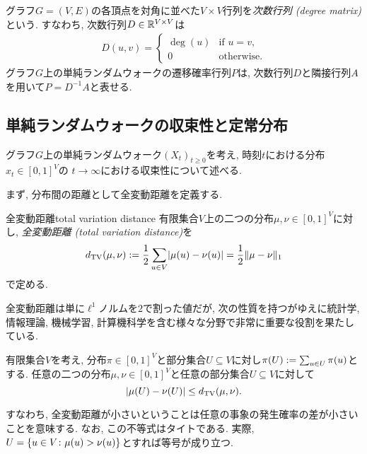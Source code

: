   グラフ$G=(V,E)$の各頂点を対角に並べた$V\times V$行列を\emph{次数行列 (degree matrix)}という.
  すなわち, 次数行列$D\in \Real^{V\times V}$は
  \begin{align*}
    D(u,v) = \begin{cases}
      \deg(u)	& \text{if }u=v,\\
      0 & \text{otherwise}.
    \end{cases}
  \end{align*}
  グラフ$G$上の単純ランダムウォークの遷移確率行列$P$は, 次数行列$D$と隣接行列$A$を用いて$P=D^{-1}A$と表せる.

\subsection{単純ランダムウォークの収束性と定常分布}
グラフ$G$上の単純ランダムウォーク$(X_t)_{t\ge 0}$を考え, 時刻$t$における分布$x_t \in [0,1]^V$の
$t\to \infty$における収束性について述べる.

まず, 分布間の距離として全変動距離を定義する.
\begin{definition}{全変動距離}{total variation distance}
  有限集合$V$上の二つの分布$\mu,\nu \in[0,1]^V$に対し, \emph{全変動距離 (total variation distance)}を
  \[
    \dtv (\mu ,\nu ) \defeq \frac{1}{2} \sum_{u\in V}\abs{\mu(u) - \nu(u)} = \frac{1}{2} \norm{\mu - \nu}_1
  \]
  で定める.
\end{definition}
全変動距離は単に$\ell^1$ノルムを$2$で割った値だが, 次の性質を持つがゆえに統計学, 情報理論, 機械学習, 計算機科学を含む様々な分野で非常に重要な役割を果たしている.
\begin{proposition}{}{}
  有限集合$V$を考え, 分布$\pi\in[0,1]^V$と部分集合$U\subseteq V$に対し$\pi(U)\defeq\sum_{u\in U}\pi(u)$とする.
  任意の二つの分布$\mu,\nu\in[0,1]^V$と任意の部分集合$U\subseteq V$に対して
  \[
    \abs*{ \mu(U) - \nu(U) } \le \dtv(\mu,\nu).
  \]
\end{proposition}
すなわち,
全変動距離が小さいということは任意の事象の発生確率の差が小さいことを意味する.
なお, この不等式はタイトである.
実際, $U=\cbra*{ u\in V \colon \mu(u) > \nu(u) }$とすれば等号が成り立つ.

